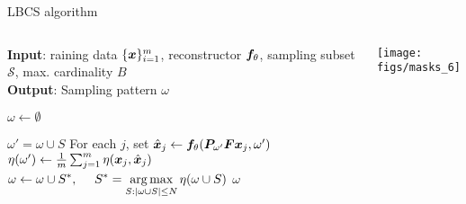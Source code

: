 \begin{frame}{LBCS algorithm}
  \begin{columns}     
  \vspace{-.5cm}
  \begin{algorithm}[H]
      \small
      \caption{LBCS \parencite{gozcu2018learning}}
      \textbf{Input}: raining data $\{{\bm{x}}\}_{i=1}^m$, reconstructor ${\bm{f}}_\theta$, sampling subset $\mathcal{S}$, max. cardinality $B$\\
      \textbf{Output}: Sampling pattern $\omega$ 
      \begin{algorithmic}[1]
          \State $\omega \leftarrow \emptyset$
          
                  \State $\omega' = \omega \cup S$
                  \State For each $j$, set $\hat{{\bm{x}}}_j \leftarrow {\bm{f}}_\theta( {\bm{P}}_{\omega'}{\bm{F}}{\bm{x}}_j,\omega')$ 
                  \State $\eta(\omega') \leftarrow \frac{1}{m}\sum_{j=1}^m \eta({\bm{x}}_j,\hat{{\bm{x}}}_j)$
              \EndFor
              \State $\displaystyle  \omega \leftarrow \omega \cup S^*, \mbox{ ~~~}
              S^* = \operatorname*{arg\,max}_{S:|\omega \cup S| \leq N} \eta(\omega \cup S)$
          \EndWhile
           $\omega$
      \end{algorithmic}
  \end{algorithm}
  \centering
  \texttt{[image: figs/masks\_6]}%
\end{columns}
\end{frame}

